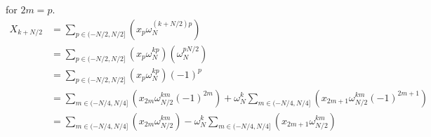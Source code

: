 \documentclass{article}
\begin{document}
%
for $2m = p$.
%
\begin {equation}
\begin {aligned}
X_{k + N/2} &= \sum_{p \in (-N/2, N/2]} (x_p \omega_N^{(k + N/2) p}) \\
            &= \sum_{p \in (-N/2, N/2]} (x_p \omega_N^{k p}) (\omega_N^{p N/2}) \\
            &= \sum_{p \in (-N/2, N/2]} (x_p \omega_N^{k p}) (-1)^p \\
            &= \sum_{m \in (-N/4, N/4]} (x_{2m} \omega_{N/2}^{k m} (-1)^{2m}) + \omega_N^{k} \sum_{m \in (-N/4, N/4]} (x_{2m+1} \omega_{N/2}^{km} (-1)^{2m+1}) \\
            &= \sum_{m \in (-N/4, N/4]} (x_{2m} \omega_{N/2}^{k m}) - \omega_N^{k} \sum_{m \in (-N/4, N/4]} (x_{2m+1} \omega_{N/2}^{km})
\end {aligned}
\end {equation}
%
\end{document}
